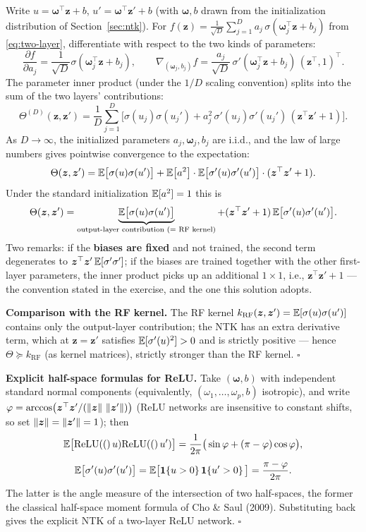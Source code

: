 \begin{description}[style=nextline, itemsep=1.2ex]
\item[Exercise \ref{ex:ntk} (explicit form of the two-layer NTK)]
Write $u = \bm{\omega}^\top\bm{z} + b$, $u' = \bm{\omega}^\top\bm{z}' + b$ (with $\bm{\omega}, b$ drawn from the initialization distribution of Section~\ref{sec:ntk}). For $f(\bm{z}) = \frac{1}{\sqrt{D}}\sum_{j=1}^D a_j\,\sigma(\bm{\omega}_j^\top\bm{z} + b_j)$ from \eqref{eq:two-layer}, differentiate with respect to the two kinds of parameters:
\[
  \frac{\partial f}{\partial a_j} = \frac{1}{\sqrt{D}}\sigma(\bm{\omega}_j^\top\bm{z} + b_j),
  \qquad
  \nabla_{(\bm{\omega}_j, b_j)} f = \frac{a_j}{\sqrt{D}}\,\sigma'(\bm{\omega}_j^\top\bm{z} + b_j)\,(\bm{z}^\top, 1)^\top .
\]
The parameter inner product (under the $1/D$ scaling convention) splits into the sum of the two layers' contributions:
\[
  \Theta^{(D)}(\bm{z},\bm{z}')
  = \frac{1}{D}\sum_{j=1}^D \Big[\sigma(u_j)\sigma(u_j') + a_j^2\,\sigma'(u_j)\sigma'(u_j')\,(\bm{z}^\top\bm{z}' + 1)\Big] .
\]
As $D \to \infty$, the initialized parameters $a_j, \bm{\omega}_j, b_j$ are i.i.d., and the law of large numbers gives pointwise convergence to the expectation:
\[
  \Theta(\bm{z},\bm{z}') = \mathbb{E}\big[\sigma(u)\sigma(u')\big] + \mathbb{E}\big[a^2\big]\cdot\mathbb{E}\big[\sigma'(u)\sigma'(u')\big]\cdot(\bm{z}^\top\bm{z}' + 1).
\]
Under the standard initialization $\mathbb{E}[a^2] = 1$ this is
\[
  \Theta(\bm{z},\bm{z}') = \underbrace{\mathbb{E}\big[\sigma(u)\sigma(u')\big]}_{\text{output-layer contribution (= RF kernel)}} + (\bm{z}^\top\bm{z}' + 1)\,\mathbb{E}\big[\sigma'(u)\sigma'(u')\big] .
\]
Two remarks: if the \textbf{biases are fixed} and not trained, the second term degenerates to $\bm{z}^\top\bm{z}'\,\mathbb{E}[\sigma'\sigma']$; if the biases are trained together with the other first-layer parameters, the inner product picks up an additional $1 \times 1$, i.e., $\bm{z}^\top\bm{z}' + 1$ --- the convention stated in the exercise, and the one this solution adopts.

\textbf{Comparison with the RF kernel.} The RF kernel $k_{\mathrm{RF}}(\bm{z},\bm{z}') = \mathbb{E}[\sigma(u)\sigma(u')]$ contains only the output-layer contribution; the NTK has an extra derivative term, which at $\bm{z} = \bm{z}'$ satisfies $\mathbb{E}[\sigma'(u)^2] > 0$ and is strictly positive --- hence $\Theta \succeq k_{\mathrm{RF}}$ (as kernel matrices), strictly stronger than the RF kernel. $\square$

\textbf{Explicit half-space formulas for ReLU.} Take $(\bm{\omega}, b)$ with independent standard normal components (equivalently, $(\omega_1,\dots,\omega_p,b)$ isotropic), and write $\varphi = \arccos\!\big(\bm{z}^\top\bm{z}' / (\left\lVert \bm{z} \right\rVert\,\left\lVert \bm{z}' \right\rVert)\big)$ (ReLU networks are insensitive to constant shifts, so set $\left\lVert \bm{z} \right\rVert = \left\lVert \bm{z}' \right\rVert = 1$); then
\[
  \mathbb{E}\big[\mathrm{ReLU}\!\left((\right)u)\mathrm{ReLU}\!\left((\right)u')\big] = \frac{1}{2\pi}\big(\sin\varphi + (\pi - \varphi)\cos\varphi\big),
\]
\[
  \mathbb{E}\big[\sigma'(u)\sigma'(u')\big] = \mathbb{E}\big[\mathbf{1}\!\left\{u > 0\right\}\mathbf{1}\!\left\{u' > 0\right\}\big] = \frac{\pi - \varphi}{2\pi}.
\]
The latter is the angle measure of the intersection of two half-spaces, the former the classical half-space moment formula of Cho \& Saul (2009). Substituting back gives the explicit NTK of a two-layer ReLU network. $\square$
\end{description}

